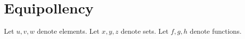 \documentclass[../../set-theory.ftl.tex]{subfiles}
\begin{document}
  \begin{comment}
    \begin{forthel}

    \end{forthel}
  \end{comment}


  \section{Equipollency}

  \begin{forthel}
  \end{forthel}

  \begin{forthel}
    Let $u,v,w$ denote elements.
    Let $x,y,z$ denote sets.
    Let $f,g,h$ denote functions.
  \end{forthel}
\end{document}
